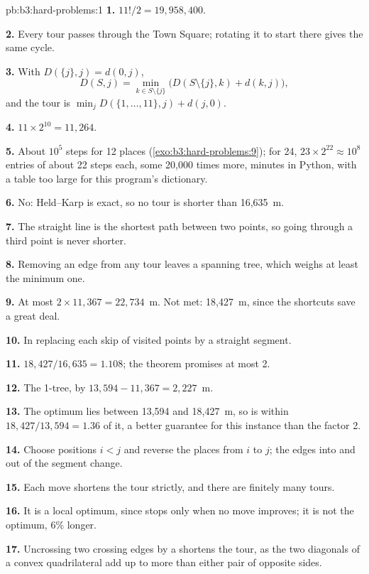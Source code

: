 \begin{solution}{pb:b3:hard-problems:1}
\textbf{1.} $11!/2 = 19{,}958{,}400$.

\textbf{2.} Every tour passes through the Town Square; rotating it to start there gives the same cycle.

\textbf{3.} With $D(\{j\}, j) = d(0, j)$,
\[ D(S, j) = \min_{k \in S \setminus \{j\}} \bigl( D(S \setminus \{j\}, k) + d(k, j) \bigr), \]
and the tour is $\min_j D(\{1, \ldots, 11\}, j) + d(j, 0)$.

\textbf{4.} $11 \times 2^{10} = 11{,}264$.

\textbf{5.} About $10^5$ steps for 12 places (\cref{exo:b3:hard-problems:9}); for 24, $23 \times 2^{22} \approx 10^8$ entries of about 22 steps each, some 20,000 times more, minutes in Python, with a table too large for this program's dictionary.

\textbf{6.} No: Held--Karp is exact, so no tour is shorter than 16,635~m.

\textbf{7.} The straight line is the shortest path between two points, so going through a third point is never shorter.

\textbf{8.} Removing an edge from any tour leaves a spanning tree, which weighs at least the minimum one.

\textbf{9.} At most $2 \times 11{,}367 = 22{,}734$~m. Not met: 18,427~m, since the shortcuts save a great deal.

\textbf{10.} In replacing each skip of visited points by a straight segment.

\textbf{11.} $18{,}427 / 16{,}635 = 1.108$; the theorem promises at most 2.

\textbf{12.} The 1-tree, by $13{,}594 - 11{,}367 = 2{,}227$~m.

\textbf{13.} The optimum lies between 13,594 and 18,427~m, so  is within $18{,}427 / 13{,}594 = 1.36$ of it, a better guarantee for this instance than the factor 2.

\textbf{14.} Choose positions $i < j$ and reverse the places from $i$ to $j$; the edges into and out of the segment change.

\textbf{15.} Each move shortens the tour strictly, and there are finitely many tours.

\textbf{16.} It is a local optimum, since  stops only when no move improves; it is not the optimum, 6\% longer.

\textbf{17.} Uncrossing two crossing edges by a  shortens the tour, as the two diagonals of a convex quadrilateral add up to more than either pair of opposite sides.


\end{solution}
